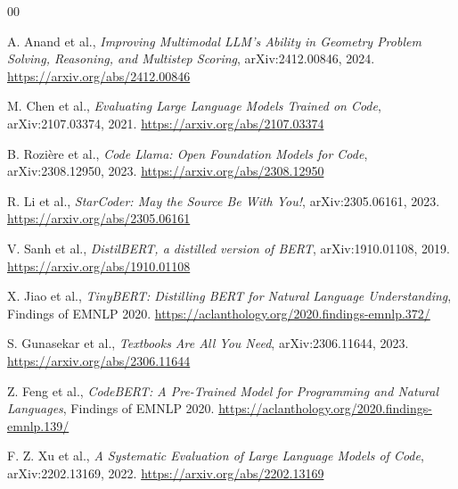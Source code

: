 \documentclass[preprint,12pt]{elsarticle}
\begin{document}
\begin{thebibliography}{00}

A. Anand et al., \textit{Improving Multimodal LLM’s Ability in Geometry Problem Solving, Reasoning, and Multistep Scoring}, arXiv:2412.00846, 2024. \url{https://arxiv.org/abs/2412.00846}

M. Chen et al., \textit{Evaluating Large Language Models Trained on Code}, arXiv:2107.03374, 2021. \url{https://arxiv.org/abs/2107.03374}

B. Rozière et al., \textit{Code Llama: Open Foundation Models for Code}, arXiv:2308.12950, 2023. \url{https://arxiv.org/abs/2308.12950}

R. Li et al., \textit{StarCoder: May the Source Be With You!}, arXiv:2305.06161, 2023. \url{https://arxiv.org/abs/2305.06161}

V. Sanh et al., \textit{DistilBERT, a distilled version of BERT}, arXiv:1910.01108, 2019. \url{https://arxiv.org/abs/1910.01108}

X. Jiao et al., \textit{TinyBERT: Distilling BERT for Natural Language Understanding}, Findings of EMNLP 2020. \url{https://aclanthology.org/2020.findings-emnlp.372/}

S. Gunasekar et al., \textit{Textbooks Are All You Need}, arXiv:2306.11644, 2023. \url{https://arxiv.org/abs/2306.11644}

Z. Feng et al., \textit{CodeBERT: A Pre-Trained Model for Programming and Natural Languages}, Findings of EMNLP 2020. \url{https://aclanthology.org/2020.findings-emnlp.139/}

F. Z. Xu et al., \textit{A Systematic Evaluation of Large Language Models of Code}, arXiv:2202.13169, 2022. \url{https://arxiv.org/abs/2202.13169}

\end{thebibliography}
\end{document}
